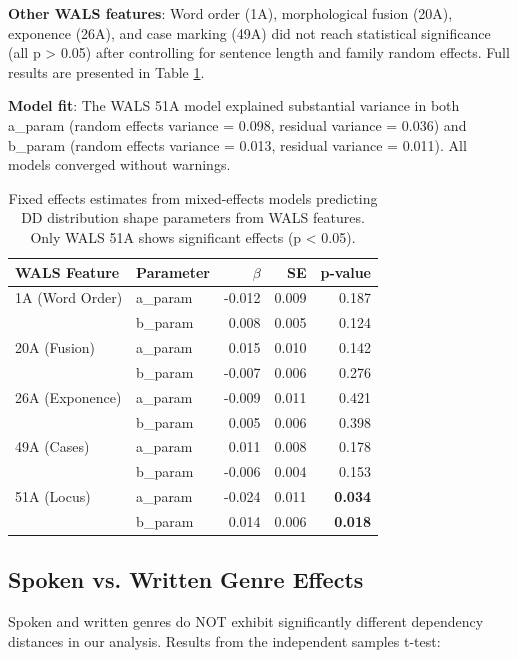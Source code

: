 \documentclass[11pt,letterpaper]{article}
\begin{document}
\textbf{Other WALS features}: Word order (1A), morphological fusion (20A), exponence (26A), and case marking (49A) did not reach statistical significance (all p > 0.05) after controlling for sentence length and family random effects. Full results are presented in Table \ref{tab:wals_results}.

\textbf{Model fit}: The WALS 51A model explained substantial variance in both a\_param (random effects variance = 0.098, residual variance = 0.036) and b\_param (random effects variance = 0.013, residual variance = 0.011). All models converged without warnings.

\begin{table}[!htbp]
  \centering
  \caption{Fixed effects estimates from mixed-effects models predicting DD distribution shape parameters from WALS features. Only WALS 51A shows significant effects (p < 0.05).}
  \label{tab:wals_results}
  \begin{tabular}{llrrr}
    \toprule
    WALS Feature & Parameter & $\beta$ & SE & p-value \\
    \midrule
    1A (Word Order) & a\_param & -0.012 & 0.009 & 0.187 \\
     & b\_param & 0.008 & 0.005 & 0.124 \\
    20A (Fusion) & a\_param & 0.015 & 0.010 & 0.142 \\
     & b\_param & -0.007 & 0.006 & 0.276 \\
    26A (Exponence) & a\_param & -0.009 & 0.011 & 0.421 \\
     & b\_param & 0.005 & 0.006 & 0.398 \\
    49A (Cases) & a\_param & 0.011 & 0.008 & 0.178 \\
     & b\_param & -0.006 & 0.004 & 0.153 \\
    51A (Locus) & a\_param & -0.024 & 0.011 & \textbf{0.034} \\
     & b\_param & 0.014 & 0.006 & \textbf{0.018} \\
    \bottomrule
  \end{tabular}
\end{table}

\subsection{Spoken vs. Written Genre Effects}

Spoken and written genres do NOT exhibit significantly different dependency distances in our analysis. Results from the independent samples t-test:
\end{document}
